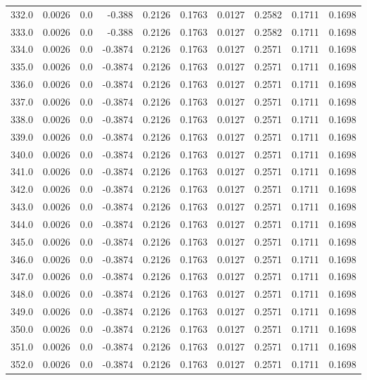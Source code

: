 \begin{longtable}{lrrrrrrrrr}
332.0 & 0.0026 & 0.0 & -0.388 & 0.2126 & 0.1763 & 0.0127 & 0.2582 & 0.1711 & 0.1698 \\
333.0 & 0.0026 & 0.0 & -0.388 & 0.2126 & 0.1763 & 0.0127 & 0.2582 & 0.1711 & 0.1698 \\
334.0 & 0.0026 & 0.0 & -0.3874 & 0.2126 & 0.1763 & 0.0127 & 0.2571 & 0.1711 & 0.1698 \\
335.0 & 0.0026 & 0.0 & -0.3874 & 0.2126 & 0.1763 & 0.0127 & 0.2571 & 0.1711 & 0.1698 \\
336.0 & 0.0026 & 0.0 & -0.3874 & 0.2126 & 0.1763 & 0.0127 & 0.2571 & 0.1711 & 0.1698 \\
337.0 & 0.0026 & 0.0 & -0.3874 & 0.2126 & 0.1763 & 0.0127 & 0.2571 & 0.1711 & 0.1698 \\
338.0 & 0.0026 & 0.0 & -0.3874 & 0.2126 & 0.1763 & 0.0127 & 0.2571 & 0.1711 & 0.1698 \\
339.0 & 0.0026 & 0.0 & -0.3874 & 0.2126 & 0.1763 & 0.0127 & 0.2571 & 0.1711 & 0.1698 \\
340.0 & 0.0026 & 0.0 & -0.3874 & 0.2126 & 0.1763 & 0.0127 & 0.2571 & 0.1711 & 0.1698 \\
341.0 & 0.0026 & 0.0 & -0.3874 & 0.2126 & 0.1763 & 0.0127 & 0.2571 & 0.1711 & 0.1698 \\
342.0 & 0.0026 & 0.0 & -0.3874 & 0.2126 & 0.1763 & 0.0127 & 0.2571 & 0.1711 & 0.1698 \\
343.0 & 0.0026 & 0.0 & -0.3874 & 0.2126 & 0.1763 & 0.0127 & 0.2571 & 0.1711 & 0.1698 \\
344.0 & 0.0026 & 0.0 & -0.3874 & 0.2126 & 0.1763 & 0.0127 & 0.2571 & 0.1711 & 0.1698 \\
345.0 & 0.0026 & 0.0 & -0.3874 & 0.2126 & 0.1763 & 0.0127 & 0.2571 & 0.1711 & 0.1698 \\
346.0 & 0.0026 & 0.0 & -0.3874 & 0.2126 & 0.1763 & 0.0127 & 0.2571 & 0.1711 & 0.1698 \\
347.0 & 0.0026 & 0.0 & -0.3874 & 0.2126 & 0.1763 & 0.0127 & 0.2571 & 0.1711 & 0.1698 \\
348.0 & 0.0026 & 0.0 & -0.3874 & 0.2126 & 0.1763 & 0.0127 & 0.2571 & 0.1711 & 0.1698 \\
349.0 & 0.0026 & 0.0 & -0.3874 & 0.2126 & 0.1763 & 0.0127 & 0.2571 & 0.1711 & 0.1698 \\
350.0 & 0.0026 & 0.0 & -0.3874 & 0.2126 & 0.1763 & 0.0127 & 0.2571 & 0.1711 & 0.1698 \\
351.0 & 0.0026 & 0.0 & -0.3874 & 0.2126 & 0.1763 & 0.0127 & 0.2571 & 0.1711 & 0.1698 \\
352.0 & 0.0026 & 0.0 & -0.3874 & 0.2126 & 0.1763 & 0.0127 & 0.2571 & 0.1711 & 0.1698 \\

\end{longtable}
